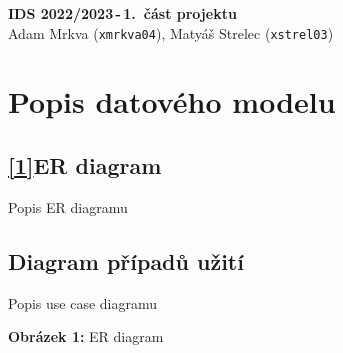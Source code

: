 \documentclass[11pt,a4paper,landscape]{article}
\begin{document}
    \begin{center}
        \Large{\textbf{IDS 2022/2023\,-\,1.~část projektu}} \\ \normalsize
        Adam Mrkva (\verb|xmrkva04|), Matyáš Strelec (\verb|xstrel03|)
    \end{center}

\section*{Popis datového modelu}


\subsection*{\ref{1}ER diagram}
Popis ER diagramu


\subsection*{Diagram případů užití}
Popis use case diagramu


\newpage

\vspace*{-3cm}
\noindent
{}
\vspace*{-2cm}
\begin{center}
    \caption{\textbf{Obrázek 1:} ER diagram}
    \end{center}

\newpage
\end{document}

